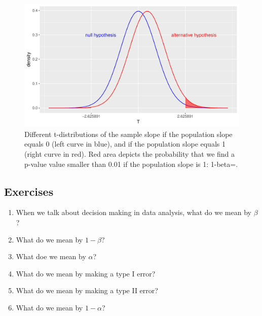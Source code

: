 \documentclass[]{book}\usepackage[]{graphicx}\usepackage[]{color}
\makeatletter
\def\maxwidth{ %
  \ifdim\Gin@nat@width>\linewidth
    \linewidth
  \else
    \Gin@nat@width
  \fi
}
\newenvironment{knitrout}{}{} %
\makeatother
\begin{document}
\begin{knitrout}
\color{fgcolor}\begin{figure}

{\centering \includegraphics[width=\maxwidth]{figure/inf_23-1} 

}

\caption[Different t-distributions of the sample slope if the population slope equals 0 (left curve in blue), and if the population slope equals 1 (right curve in red)]{Different t-distributions of the sample slope if the population slope equals 0 (left curve in blue), and if the population slope equals 1 (right curve in red). Red area depicts the probability that we find a p-value value smaller than 0.01 if the population slope is 1: 1-beta=.}\label{fig:inf_23}
\end{figure}


\end{knitrout}


\subsection{Exercises}

\begin{enumerate}

\item When we talk about decision making in data analysis, what do we mean by $\beta$?

\item What do we mean by $1-\beta$?

\item What doe we mean by $\alpha$?

\item What do we mean by making a type I error?

\item What do we mean by making a type II error?

\item What do we mean by $1-\alpha$?


\end{enumerate}
\end{document}
